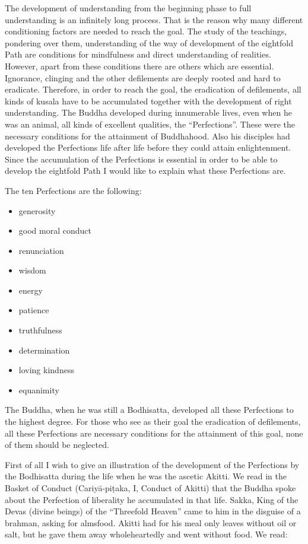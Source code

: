\documentclass{book}
\begin{document}
The development of understanding from the beginning phase to full
understanding is an infinitely long process. That is the reason why many
different conditioning factors are needed to reach the goal. The study
of the teachings, pondering over them, understanding of the way of
develop­ment of the eightfold Path are conditions for mindfulness and
direct understanding of realities. However, apart from these conditions
there are others which are essential. Ignorance, clinging and the other
defilements are deeply rooted and hard to eradicate. Therefore, in order
to reach the goal, the eradication of defilements, all kinds of kusala
have to be accumulated together with the development of right
understanding. The Buddha developed during in­numer­able lives, even
when he was an animal, all kinds of excellent qualities, the
``Perfections''. These were the neces­sary conditions for the attainment
of Buddhahood. Also his disciples had developed the Perfections life
after life before they could attain enlightenment. Since the
accumulation of the Perfections is essential in order to be able to
develop the eightfold Path I would like to explain what these
Perfections are.

The ten Perfections are the following:

\begin{itemize}
\item
  generosity
\item
  good moral conduct
\item
  renunciation
\item
  wisdom
\item
  energy
\item
  patience
\item
  truthfulness
\item
  determination
\item
  loving kindness
\item
  equanimity
\end{itemize}

The Buddha, when he was still a Bodhisatta, developed all these
Perfections to the highest degree. For those who see as their goal the
eradication of defilements, all these Perfections are necessary
conditions for the attainment of this goal, none of them should be
neglected.

First of all I wish to give an illustration of the develop­ment of the
Perfections by the Bodhisatta during the life when he was the ascetic
Akitti. We read in the Basket of Conduct (Cariyā-piṭaka, I, Conduct of
Akitti) that the Buddha spoke about the Perfection of liberality he
accum­ulated in that life. Sakka, King of the Devas (divine beings) of
the ``Threefold Heaven'' came to him in the disguise of a brahman,
asking for almsfood. Akitti had for his meal only leaves without oil or
salt, but he gave them away whole­heartedly and went without food. We
read:
\end{document}
